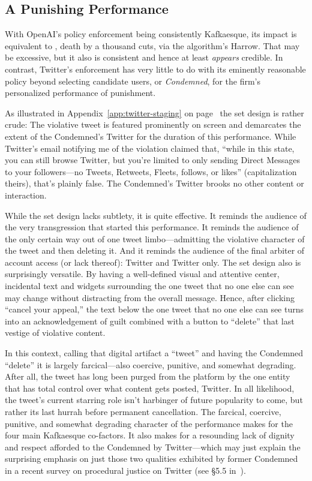 \subsection{A Punishing Performance}

With OpenAI's policy enforcement being consistently Kafkaesque, its impact is
equivalent to \lingchi, death by a thousand cuts, via the algorithm's Harrow.
That may be excessive, but it also is consistent and hence at least
\emph{appears} credible. In contrast, Twitter's enforcement has very little to
do with its eminently reasonable policy beyond selecting candidate users, or
\emph{Condemned}, for the firm's personalized performance of punishment.

As illustrated in Appendix~\ref{app:twitter-staging} on
page~\pageref{app:twitter-staging} the set design is rather crude: The violative
tweet is featured prominently on screen and demarcates the extent of the
Condemned's Twitter for the duration of this performance. While Twitter's email
notifying me of the violation claimed that, ``while in this state, you can still
browse Twitter, but you're limited to only sending Direct Messages to your
followers---no Tweets, Retweets, Fleets, follows, or likes'' (capitalization
theirs), that's plainly false. The Condemned's Twitter brooks no other content
or interaction.

While the set design lacks subtlety, it is quite effective. It reminds the
audience of the very transgression that started this performance. It reminds the
audience of the only certain way out of one tweet limbo---admitting the
violative character of the tweet and then deleting it. And it reminds the
audience of the final arbiter of account access (or lack thereof): Twitter and
Twitter only. The set design also is surprisingly versatile. By having a
well-defined visual and attentive center, incidental text and  widgets
surrounding the one tweet that no one else can see may change without
distracting from the overall message. Hence, after clicking ``cancel your
appeal,'' the text below the one tweet that no one else can see turns into an
acknowledgement of guilt combined with a button to ``delete'' that last vestige
of violative content.

In this context, calling that digital artifact a ``tweet'' and having the
Condemned ``delete'' it is largely farcical---also coercive, punitive, and
somewhat degrading. After all, the tweet has long been purged from the platform
by the one entity that has total control over what content gets posted, Twitter.
In all likelihood, the tweet's current starring role isn't harbinger of future
popularity to come, but rather its last hurrah before permanent cancellation.
The farcical, coercive, punitive, and somewhat degrading character of the
performance makes for the four main Kafkaesque co-factors. It also makes for a
resounding lack of dignity and respect afforded to the Condemned by
Twitter---which may just explain the surprising emphasis on just those two
qualities exhibited by former Condemned in a recent survey on procedural justice
on Twitter (see \S5.5 in~\cite{KatsarosTylerea2022}).

